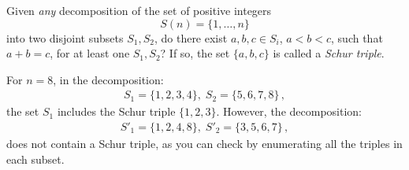 \begin{definition}
Given \emph{any} decomposition of the set of positive integers \[S(n)=\{1,\ldots,n\}\]
into two disjoint subsets $S_1,S_2$, do there exist $a,b,c\in S_i$, $a\!<\!b\!<\!c$, such that $a+b=c$, for at least one $S_1,S_2$? If so, the set $\{a,b,c\}$ is called a \emph{Schur triple}.
\end{definition}

\begin{example} For $n=8$, in the decomposition:
\begin{align}
S_1 = \{1,2,3,4\},\; S_2 = \{5,6,7,8\}\,,
\label{eq.schur0}
\end{align}
the set $S_1$ includes the Schur triple $\{1,2,3\}$.
However, the decomposition:
\begin{align}
S'_1 = \{1,2,4,8\},\; S'_2 = \{3,5,6,7\}\,,
\label{eq:schur1}
\end{align}
does not contain a Schur triple, as you can check by enumerating all the triples in each subset.
\end{example}

